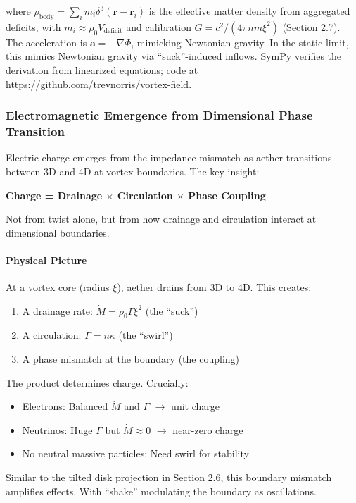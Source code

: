 where $\rho_{\text{body}} = \sum_i m_i \delta^3(\mathbf{r} - \mathbf{r}_i)$ is the effective matter density from aggregated deficits, with $m_i \approx \rho_0 V_{\text{deficit}}$ and calibration $G = c^2 / (4\pi \bar{n} \bar{m} \xi^2)$ (Section 2.7). The acceleration is $\mathbf{a} = -\nabla \Phi$, mimicking Newtonian gravity. In the static limit, this mimics Newtonian gravity via ``suck''-induced inflows. SymPy verifies the derivation from linearized equations; code at \url{https://github.com/trevnorris/vortex-field}.

\subsubsection{Electromagnetic Emergence from Dimensional Phase Transition}

Electric charge emerges from the impedance mismatch as aether transitions between 3D and 4D at vortex boundaries. The key insight:

\textbf{Charge = Drainage $\times$ Circulation $\times$ Phase Coupling}

Not from twist alone, but from how drainage and circulation interact at dimensional boundaries.

\paragraph{Physical Picture}
At a vortex core (radius $\xi$), aether drains from 3D to 4D. This creates:
\begin{enumerate}
\item A drainage rate: $\dot{M} = \rho_0 \Gamma \xi^2$ (the ``suck'')
\item A circulation: $\Gamma = n \kappa$ (the ``swirl'')  
\item A phase mismatch at the boundary (the coupling)
\end{enumerate}

The product determines charge. Crucially:
\begin{itemize}
\item Electrons: Balanced $\dot{M}$ and $\Gamma$ $\to$ unit charge
\item Neutrinos: Huge $\Gamma$ but $\dot{M} \approx 0$ $\to$ near-zero charge
\item No neutral massive particles: Need swirl for stability
\end{itemize}

Similar to the tilted disk projection in Section 2.6, this boundary mismatch amplifies effects. With ``shake'' modulating the boundary as oscillations.

